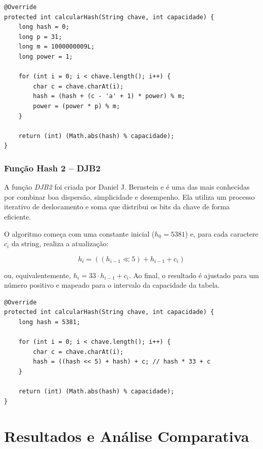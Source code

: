 \documentclass[12pt,a4paper]{abntex2}
\begin{document}
\begin{lstlisting}[style=console]
@Override
protected int calcularHash(String chave, int capacidade) {
    long hash = 0;
    long p = 31;
    long m = 1000000009L;
    long power = 1;

    for (int i = 0; i < chave.length(); i++) {
        char c = chave.charAt(i);
        hash = (hash + (c - 'a' + 1) * power) % m;
        power = (power * p) % m;
    }

    return (int) (Math.abs(hash) % capacidade);
}
\end{lstlisting}


\subsubsection{Função Hash 2 -- DJB2}
A função \textit{DJB2} foi criada por Daniel J. Bernstein e é uma das mais conhecidas por combinar boa dispersão, simplicidade e desempenho.  
Ela utiliza um processo iterativo de deslocamento e soma que distribui os bits da chave de forma eficiente.  

O algoritmo começa com uma constante inicial (\(h_0 = 5381\)) e, para cada caractere \(c_i\) da string, realiza a atualização:

\[
h_i = \left( (h_{i-1} \ll 5) + h_{i-1} + c_i \right)
\]

ou, equivalentemente, \( h_i = 33 \cdot h_{i-1} + c_i \).  
Ao final, o resultado é ajustado para um número positivo e mapeado para o intervalo da capacidade da tabela.

\begin{lstlisting}[style=console]
@Override
protected int calcularHash(String chave, int capacidade) {
    long hash = 5381;

    for (int i = 0; i < chave.length(); i++) {
        char c = chave.charAt(i);
        hash = ((hash << 5) + hash) + c; // hash * 33 + c
    }

    return (int) (Math.abs(hash) % capacidade);
}
\end{lstlisting}


\newpage

\section{Resultados e Análise Comparativa}
\end{document}
